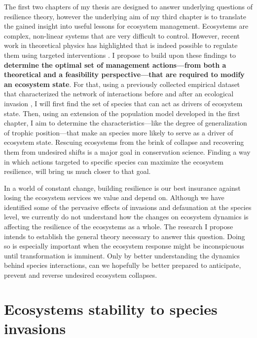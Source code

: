 \documentclass[a4paper]{article}
\begin{document}
The first two chapters of my thesis are designed to answer underlying questions of resilience theory, however the underlying aim of my third chapter is to translate the gained insight into useful lessons for ecosystem management.
Ecosystems are complex, non-linear systems that are very difficult to control.
However, recent work in theoretical physics has highlighted that is indeed possible to regulate them using targeted interventions \autocite{Cornelius2013}.
I propose to build upon these findings to \textbf{determine the optimal set of management actions---from both a theoretical and a feasibility perspective---that are required to modify an ecosystem state}.
For that, using a previously collected empirical dataset that characterized the network of interactions before and after an ecological invasion \autocite{Bartomeus2008}, I will first find the set of species that can act as drivers of ecosystem state.
Then, using an extension of the population model developed in the first chapter, I aim to determine the characteristics---like the degree of generalization of trophic position---that make an species more likely to serve as a driver of ecosystem state.
Rescuing ecosystems from the brink of collapse and recovering them from undesired shifts is a major goal in conservation science.
Finding a way in which actions targeted to specific species can maximize the ecosystem resilience, will bring us much closer to that goal.

In a world of constant change, building resilience is our best insurance against losing the ecosystem services we value and depend on.
Although we have identified some of the pervasive effects of invasions and defaunation at the species level, we currently do not understand how the changes on ecosystem dynamics is affecting the resilience of the ecosystems as a whole.
The research I propose intends to establish the general theory necessary to answer this question.
Doing so is especially important when the ecosystem response might be inconspicuous until transformation is imminent.
Only by better understanding the dynamics behind species interactions, can we hopefully be better prepared to anticipate, prevent and reverse undesired ecosystem collapses.









\section{Ecosystems stability to species invasions} \label{chapter1}
\end{document}
